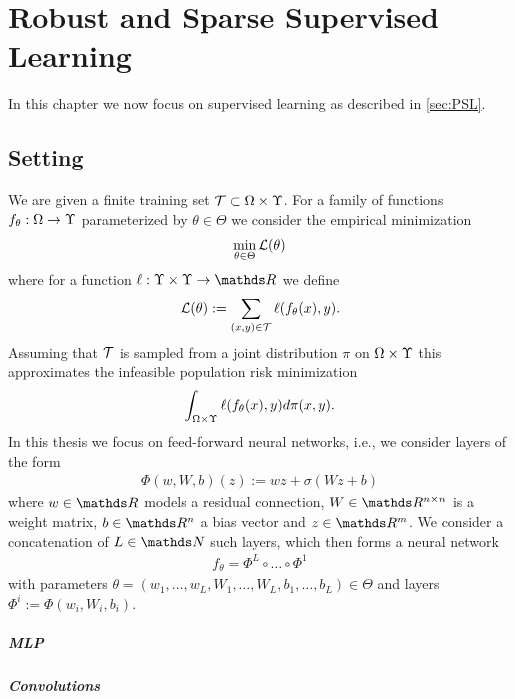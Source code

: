 \chapter{Robust and Sparse Supervised Learning}\label{ch:SL}
%
%
In this chapter we now focus on supervised learning as described in \cref{sec:PSL}. 
\cite{bungert2021clip, bungert2021neural, kabri2023resolution, bungert2022bregman}
%
\section{Setting}
%
We are given a finite training set $\mathcal{T}\subset\Omega\times\Upsilon$. For a family of functions $f_\theta:\Omega\to\Upsilon$ parameterized by $\theta\in \Theta$ we consider the empirical  minimization
%
\begin{align*}
\min_{\theta\in\Theta} \mathcal{L}(\theta) 
\end{align*} 
%
where for a function $\ell:\OutSpace\times\OutSpace\to\R$ we define
\begin{align*}
\mathcal{L}(\theta)  := \sum_{(x,y)\in \mathcal{T}} \ell(f_\theta(x), y).
\end{align*}
%
Assuming that $\mathcal{T}$ is sampled from a joint distribution $\pi$ on $\Omega\times\Upsilon$ this approximates the infeasible population risk minimization
%
\begin{align*}
\int_{\Omega\times\Upsilon} \ell(f_\theta(x), y) d\pi(x,y).
\end{align*}
%
In this thesis we focus on feed-forward neural networks, i.e., we consider layers of the form
%
\begin{align*}
\Phi(w, W, b)(z):= wz + \sigma(Wz + b)
\end{align*}
%
where $w\in\R$ models a residual connection, $W\in\R^{n\times n}$ is a weight matrix, $b\in\R^n$ a bias vector and $z\in\R^{m}$. We consider a concatenation of $L\in\N$ such layers, which then forms a neural network
%
\begin{align*}
f_\theta = \Phi^L\circ\ldots\circ\Phi^1
\end{align*} 
%
with parameters $\theta =(w_1,\ldots, w_L, W_1,\ldots, W_L, b_1,\ldots, b_L)\in\Theta$ and layers $\Phi^i := \Phi(w_i, W_i, b_i)$.
%
\paragraph{MLP}

\paragraph{Convolutions}

